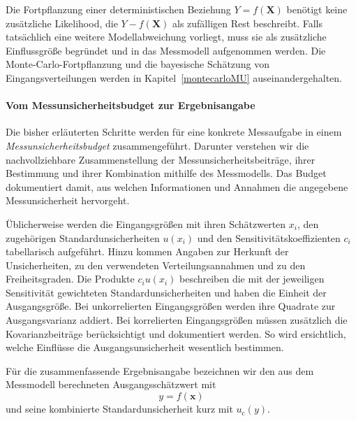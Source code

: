 Die Fortpflanzung einer deterministischen Beziehung $Y=f(\mathbf X)$
benötigt keine zusätzliche Likelihood, die $Y-f(\mathbf X)$ als zufälligen
Rest beschreibt. Falls tatsächlich eine weitere Modellabweichung vorliegt,
muss sie als zusätzliche Einflussgröße begründet und in das Messmodell
aufgenommen werden. Die Monte-Carlo-Fortpflanzung und die bayesische
Schätzung von Eingangsverteilungen werden in Kapitel~\ref{montecarloMU} auseinandergehalten.

\paragraph{Vom Messunsicherheitsbudget zur Ergebnisangabe}

Die bisher erläuterten Schritte werden für eine konkrete Messaufgabe
in einem \textsl{Messunsicherheitsbudget} zusammengeführt.
Darunter verstehen wir die nachvollziehbare Zusammenstellung
der Messunsicherheitsbeiträge, ihrer Bestimmung und ihrer Kombination
mithilfe des Messmodells. Das Budget dokumentiert damit, aus welchen
Informationen und Annahmen die angegebene Messunsicherheit hervorgeht.

Üblicherweise werden die Eingangsgrößen mit ihren Schätzwerten $x_i$,
den zugehörigen Standard\-un\-sicher\-heiten $u(x_i)$ und den
Sensitivitätskoeffizienten $c_i$ tabellarisch aufgeführt.
Hinzu kommen Angaben zur Herkunft der Unsicherheiten, zu den
verwendeten Verteilungsannahmen und zu den Freiheitsgraden.
Die Produkte $c_i u(x_i)$ beschreiben die mit der jeweiligen
Sensitivität gewichteten Standardunsicherheiten und haben
die Einheit der Ausgangsgröße. Bei unkorrelierten Eingangsgrößen
werden ihre Quadrate zur Ausgangsvarianz addiert.
Bei korrelierten Eingangsgrößen müssen zusätzlich die
Kovarianzbeiträge berücksichtigt und dokumentiert werden.
So wird ersichtlich, welche Einflüsse die Ausgangsunsicherheit
wesentlich bestimmen.

Für die zusammenfassende Ergebnisangabe bezeichnen wir den aus
dem Messmodell berechneten Ausgangsschätzwert mit
\begin{equation}
y=f(\mathbf x)
\end{equation}
und seine kombinierte Standardunsicherheit kurz mit $u_{\mathrm c}(y)$.

